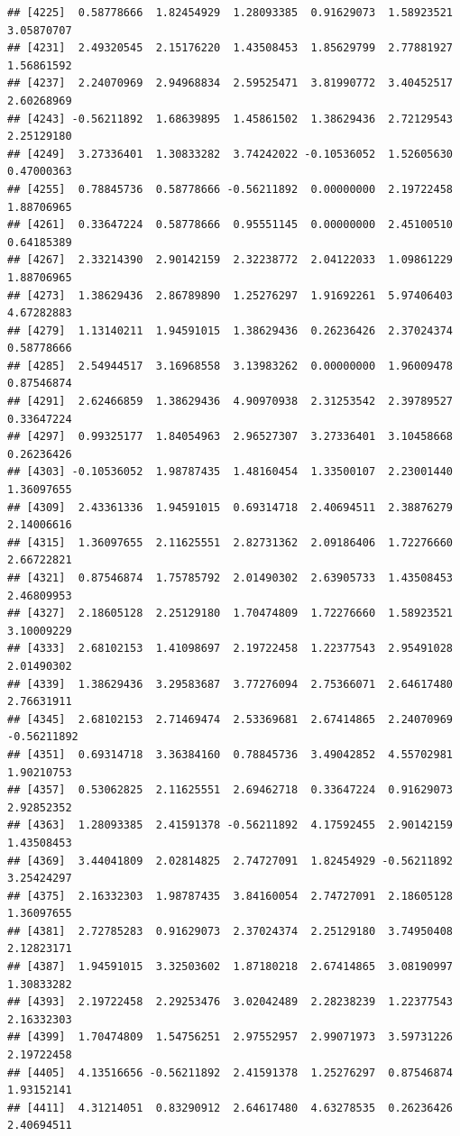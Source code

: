 \documentclass[
]{article}
\begin{document}
\begin{verbatim}
## [4225]  0.58778666  1.82454929  1.28093385  0.91629073  1.58923521  3.05870707
## [4231]  2.49320545  2.15176220  1.43508453  1.85629799  2.77881927  1.56861592
## [4237]  2.24070969  2.94968834  2.59525471  3.81990772  3.40452517  2.60268969
## [4243] -0.56211892  1.68639895  1.45861502  1.38629436  2.72129543  2.25129180
## [4249]  3.27336401  1.30833282  3.74242022 -0.10536052  1.52605630  0.47000363
## [4255]  0.78845736  0.58778666 -0.56211892  0.00000000  2.19722458  1.88706965
## [4261]  0.33647224  0.58778666  0.95551145  0.00000000  2.45100510  0.64185389
## [4267]  2.33214390  2.90142159  2.32238772  2.04122033  1.09861229  1.88706965
## [4273]  1.38629436  2.86789890  1.25276297  1.91692261  5.97406403  4.67282883
## [4279]  1.13140211  1.94591015  1.38629436  0.26236426  2.37024374  0.58778666
## [4285]  2.54944517  3.16968558  3.13983262  0.00000000  1.96009478  0.87546874
## [4291]  2.62466859  1.38629436  4.90970938  2.31253542  2.39789527  0.33647224
## [4297]  0.99325177  1.84054963  2.96527307  3.27336401  3.10458668  0.26236426
## [4303] -0.10536052  1.98787435  1.48160454  1.33500107  2.23001440  1.36097655
## [4309]  2.43361336  1.94591015  0.69314718  2.40694511  2.38876279  2.14006616
## [4315]  1.36097655  2.11625551  2.82731362  2.09186406  1.72276660  2.66722821
## [4321]  0.87546874  1.75785792  2.01490302  2.63905733  1.43508453  2.46809953
## [4327]  2.18605128  2.25129180  1.70474809  1.72276660  1.58923521  3.10009229
## [4333]  2.68102153  1.41098697  2.19722458  1.22377543  2.95491028  2.01490302
## [4339]  1.38629436  3.29583687  3.77276094  2.75366071  2.64617480  2.76631911
## [4345]  2.68102153  2.71469474  2.53369681  2.67414865  2.24070969 -0.56211892
## [4351]  0.69314718  3.36384160  0.78845736  3.49042852  4.55702981  1.90210753
## [4357]  0.53062825  2.11625551  2.69462718  0.33647224  0.91629073  2.92852352
## [4363]  1.28093385  2.41591378 -0.56211892  4.17592455  2.90142159  1.43508453
## [4369]  3.44041809  2.02814825  2.74727091  1.82454929 -0.56211892  3.25424297
## [4375]  2.16332303  1.98787435  3.84160054  2.74727091  2.18605128  1.36097655
## [4381]  2.72785283  0.91629073  2.37024374  2.25129180  3.74950408  2.12823171
## [4387]  1.94591015  3.32503602  1.87180218  2.67414865  3.08190997  1.30833282
## [4393]  2.19722458  2.29253476  3.02042489  2.28238239  1.22377543  2.16332303
## [4399]  1.70474809  1.54756251  2.97552957  2.99071973  3.59731226  2.19722458
## [4405]  4.13516656 -0.56211892  2.41591378  1.25276297  0.87546874  1.93152141
## [4411]  4.31214051  0.83290912  2.64617480  4.63278535  0.26236426  2.40694511

\end{verbatim}
\end{document}
